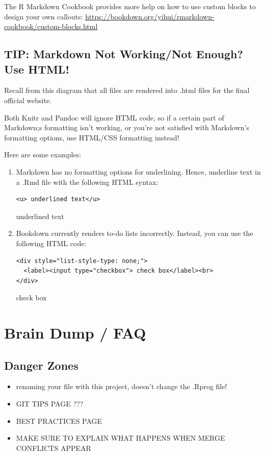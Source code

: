 \documentclass[
]{book}
\theoremstyle{definition}
\theoremstyle{definition}
\theoremstyle{definition}
\theoremstyle{definition}
\theoremstyle{remark}
\begin{document}
The R Markdown Cookbook provides more help on how to use custom blocks to design your own callouts: \url{https://bookdown.org/yihui/rmarkdown-cookbook/custom-blocks.html}

\section{TIP: Markdown Not Working/Not Enough? Use HTML!}\label{use-html}

Recall from this diagram that all files are rendered into .html files for the final official website.

Both Knitr and Pandoc will ignore HTML code, so if a certain part of Markdown;s formatting isn't working, or you're not satisfied with Markdown's formatting options, use HTML/CSS formatting instead!

Here are some examples:

\begin{enumerate}
\def\labelenumi{\arabic{enumi}.}
\item
  Markdown has no formatting options for underlining. Hence, underline text in a .Rmd file with the following HTML syntax:

\begin{verbatim}
<u> underlined text</u>
\end{verbatim}

  underlined text
\item
  Bookdown currently renders to-do lists incorrectly. Instead, you can use the following HTML code:

\begin{verbatim}
<div style="list-style-type: none;">
  <label><input type="checkbox"> check box</label><br>
</div>
\end{verbatim}

  check box
\end{enumerate}

\chapter{Brain Dump / FAQ}\label{brain-dump-faq}

\section{Danger Zones}\label{danger-zones}

\begin{itemize}
\item
  renaming your file with this project, doesn't change the .Rprog file!
\item
  GIT TIPS PAGE ???
\item
  BEST PRACTICES PAGE
\item
  MAKE SURE TO EXPLAIN WHAT HAPPENS WHEN MERGE CONFLICTS APPEAR
\end{itemize}
\end{document}
